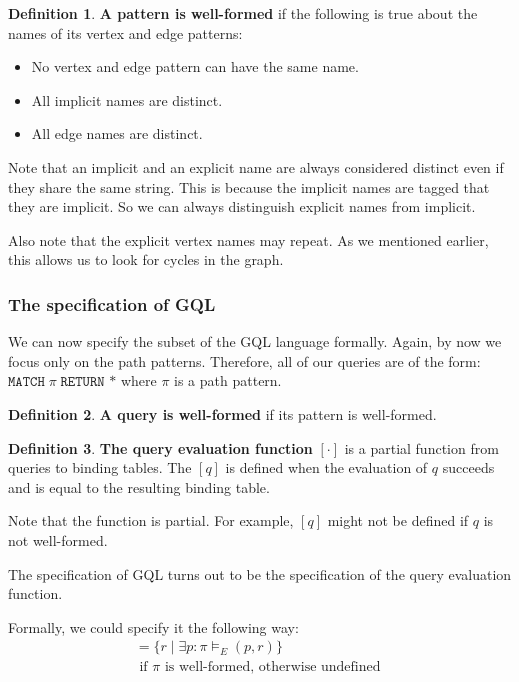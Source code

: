 \documentclass[14pt]{constructor-thesis}
\theoremstyle{definition}
\newtheorem*{definition}{Definition}
\begin{document}
\begin{definition}
  \textbf{A pattern is well-formed} if the following is true about the names of its vertex and edge patterns:
  \begin{itemize}
    \item No vertex and edge pattern can have the same name.
    \item All implicit names are distinct.
    \item All edge names are distinct.
  \end{itemize}
\end{definition}

Note that an implicit and an explicit name are always considered distinct even if they share the same string. This is because the implicit names are tagged that they are implicit. So we can always distinguish explicit names from implicit.

Also note that the explicit vertex names may repeat. As we mentioned earlier, this allows us to look for cycles in the graph.

\subsubsection{The specification of GQL}

We can now specify the subset of the GQL language formally.
Again, by now we focus only on the path patterns. Therefore, all of our queries are of the form: $\texttt{MATCH} \; \pi \; \texttt{RETURN *}$ where $\pi$ is a path pattern. 

\begin{definition}
  \textbf{A query is well-formed} if its pattern is well-formed.
\end{definition}

\begin{definition}
  \textbf{The query evaluation function} $[ \cdot ]$ is a partial function from queries to binding tables. The $[q]$ is defined when the evaluation of $q$ succeeds and is equal to the resulting binding table.
\end{definition}

Note that the function is partial. For example, $[q]$ might not be defined if $q$ is not well-formed.

The specification of GQL turns out to be the specification of the query evaluation function.

Formally, we could specify it the following way:
\begin{align*}
  [\texttt{MATCH} \; \pi \; \texttt{RETURN *}] = \{ r \mid \exists p : \pi \models_E (p, r) \} \\ \text{ if $\pi$ is well-formed, otherwise undefined }
\end{align*} 
\end{document}
